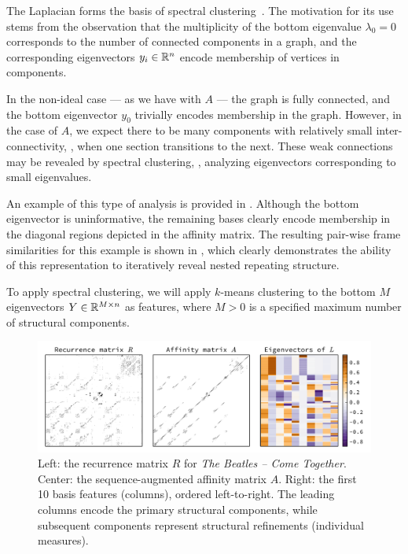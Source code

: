 \documentclass{article}
\begin{document}
The Laplacian forms the basis of spectral clustering~\cite{von2007tutorial}.  The
motivation for its use stems from the observation that the multiplicity of the bottom
eigenvalue $\lambda_0 = 0$ corresponds to the number of connected components in a
graph, and the corresponding eigenvectors $y_i \in \mathbb{R}^n$ encode membership of vertices
in components.

In the non-ideal case --- as we have with $A$ --- the graph is fully connected, and
the bottom eigenvector $y_0$ trivially encodes membership in the graph.  
However, in the case of $A$, we expect there to be many components
with relatively small inter-connectivity, \ie, when one section transitions to the
next.  These weak connections may be revealed by spectral clustering, \ie, analyzing 
eigenvectors corresponding to small eigenvalues.

An example of this type of analysis is provided in .  Although the
bottom eigenvector is uninformative, the remaining bases clearly encode membership in
the diagonal regions depicted in the affinity matrix.  The resulting pair-wise frame
similarities for this example is shown in , which clearly demonstrates
the ability of this representation to iteratively reveal nested repeating structure.

To apply spectral clustering, we will apply $k$-means clustering to the bottom $M$ 
eigenvectors $Y \in \mathbb{R}^{M \times n}$ as features, where $M > 0$ is a specified maximum 
number of structural components.

\begin{figure}
\centering
\includegraphics[width=\textwidth]{figs/recurrence}
\caption{Left: the recurrence matrix $R$ for \emph{The Beatles -- Come
Together}. Center: the sequence-augmented affinity matrix $A$.
Right: the first 10 basis features (columns), ordered left-to-right.  
The leading columns encode the primary structural components, while subsequent components represent structural refinements (individual measures).\label{recurrence}}
\end{figure}
\end{document}

